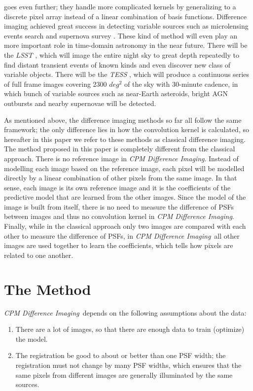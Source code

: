 \documentclass[12pt, preprint]{aastex}
\newcommand{\project}[1]{\textsl{#1}}
\newcommand{\cpmdiff}{\project{CPM Difference Imaging}}
\begin{document}
\cite{bramich} goes even further; they handle more complicated kernels by generalizing to a discrete pixel array instead of a linear combination of basis functions.
Difference imaging achieved great success in detecting variable sources such as microlensing events search \citep{macho, ogle} and supernova survey \citep{sdss}.
These kind of method will even play an more important role in time-domain astronomy in the near future. 
There will be the \project{LSST} \citep{lsst}, which will image the entire night sky to great depth repeatedly to find distant transient events of known kinds and even discover new class of variable objects. 
There will be the \project{TESS} \citep{tess}, which will produce a continuous series of full frame images covering 2300 $deg^2$ of the sky with 30-minute cadence, in which bunch of variable sources such as near-Earth asteroids,  bright AGN outbursts and nearby supernovae will be detected. 

As mentioned above, the difference imaging methods so far \citep{imagesub1, alard, varyingkernel, bramich} all follow the same framework; the only difference lies in how the convolution kernel is calculated, so hereafter in this paper we refer to these methods as classical difference imaging. 
The method proposed in this paper is completely different from the classical approach. 
There is no reference image in \cpmdiff. 
Instead of modelling each image based on the reference image, each pixel will be modelled directly by a linear combination of other pixels from the same image. 
In that sense, each image is its own reference image and it is the coefficients of the predictive model that are learned from the other images.
Since the model of the image is built from itself, there is no need to measure the difference of PSFs between images and thus no convolution kernel in \cpmdiff. 
Finally, while in the classical approach only two images are compared with each other to measure the difference of PSFs, in \cpmdiff\ all other images are used together to learn the coefficients, which tells how pixels are related to one another.

\section{The Method} \label{method}
\cpmdiff\ depends on the following assumptions about the data:
\begin{enumerate}
\item
There are a lot of images, so that there are enough data to train (optimize) the model.
\item
The registration be good to about or better than one PSF width; the registration must not change by many PSF widths, which ensures that the same pixels from different images are generally illuminated by the same sources.
\end{enumerate}
\end{document}
